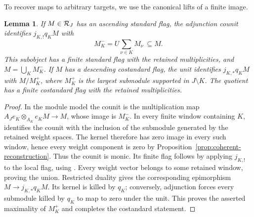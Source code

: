 \documentclass[11pt,reqno]{amsart}
\newtheorem{lemma}[theorem]{Lemma}
\theoremstyle{definition}
\theoremstyle{remark}
\numberwithin{equation}{section}
\begin{document}
To recover maps to arbitrary targets, we use the canonical lifts of a
finite image.

\begin{lemma}\label{lem:canonical-lifts}
If $M\in\mathcal R_J$ has an ascending standard flag, the adjunction counit
identifies $j_{K,!}q_KM$ with
\[
 M_K^-=U\sum_{\nu\in K}M_\nu\ \subseteq M.
\]
This subobject has a finite standard flag with the retained
multiplicities, and $M=\bigcup_KM_K^-$. If $M$ has a descending
costandard flag, the unit identifies $j_{K,*}q_KM$ with $M/M_K^+$,
where $M_K^+$ is the largest submodule supported in $J\setminus K$.
The quotient has a finite costandard flag with the retained
multiplicities.
\end{lemma}
\begin{proof}
In the module model the counit is the multiplication map
$A_Je_K\otimes_{A_K}e_KM\to M$, whose image is $M_K^-$.
In every finite window containing $K$, \cite[Corollary~3.19]{BS}
identifies the counit with the inclusion of the submodule generated
by the retained weight spaces.
The kernel therefore has zero image in every such window, hence
every weight component is zero by
Proposition~\ref{prop:coherent-reconstruction}. Thus the counit is
monic. Its finite flag
follows by applying $j_{K,!}$ to the local flag, using
\cite[Theorem~3.42]{BS}. Every weight vector belongs to some retained
window, proving the union. Restricted duality gives the corresponding
epimorphism $M\to j_{K,*}q_KM$. Its kernel is killed by $q_K$;
conversely, adjunction forces every submodule killed by $q_K$ to map
to zero under the unit. This proves the asserted maximality of
$M_K^+$ and completes the costandard statement.
\end{proof}
\end{document}

